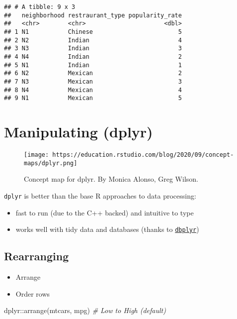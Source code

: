 \documentclass[
]{book}
\newenvironment{Shaded}{\begin{snugshade}}{\end{snugshade}}
\newcommand{\CommentTok}[1]{\textcolor[rgb]{0.56,0.35,0.01}{\textit{#1}}}
\newcommand{\FunctionTok}[1]{\textcolor[rgb]{0.00,0.00,0.00}{#1}}
\newcommand{\NormalTok}[1]{#1}
\newcommand{\SpecialCharTok}[1]{\textcolor[rgb]{0.00,0.00,0.00}{#1}}
\providecommand{\tightlist}{%
  \setlength{\itemsep}{0pt}\setlength{\parskip}{0pt}}
\begin{document}
\begin{verbatim}
## # A tibble: 9 x 3
##   neighborhood restraurant_type popularity_rate
##   <chr>        <chr>                      <dbl>
## 1 N1           Chinese                        5
## 2 N2           Indian                         4
## 3 N3           Indian                         3
## 4 N4           Indian                         2
## 5 N1           Indian                         1
## 6 N2           Mexican                        2
## 7 N3           Mexican                        3
## 8 N4           Mexican                        4
## 9 N1           Mexican                        5
\end{verbatim}

\hypertarget{manipulating-dplyr}{%
\section{Manipulating (dplyr)}\label{manipulating-dplyr}}

\begin{figure}
\centering
\texttt{[image: https://education.rstudio.com/blog/2020/09/concept-maps/dplyr.png]}
\caption{Concept map for dplyr. By Monica Alonso, Greg Wilson.}
\end{figure}

\texttt{dplyr} is better than the base R approaches to data processing:

\begin{itemize}
\tightlist
\item
  fast to run (due to the C++ backed) and intuitive to type
\item
  works well with tidy data and databases (thanks to \href{https://dbplyr.tidyverse.org/}{\texttt{dbplyr}})
\end{itemize}

\hypertarget{rearranging}{%
\subsection{Rearranging}\label{rearranging}}

\begin{itemize}
\item
  Arrange
\item
  Order rows
\end{itemize}

\begin{Shaded}
\begin{Highlighting}[]
\NormalTok{dplyr}\SpecialCharTok{::}\FunctionTok{arrange}\NormalTok{(mtcars, mpg) }\CommentTok{\# Low to High (default)}
\end{Highlighting}
\end{Shaded}
\end{document}
